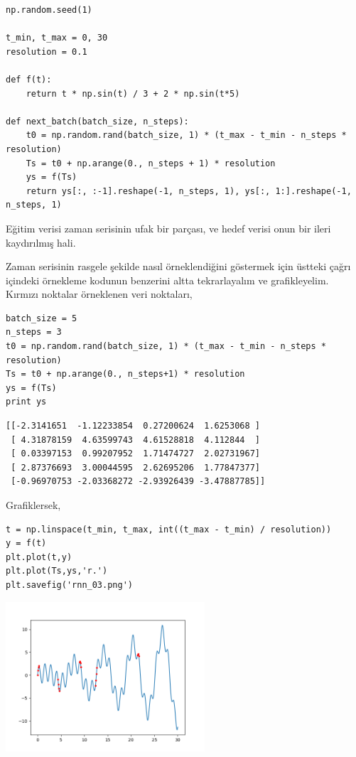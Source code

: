 \documentclass[12pt,fleqn]{article}\usepackage{../../common}
\begin{document}
\begin{verbatim}
np.random.seed(1)

t_min, t_max = 0, 30
resolution = 0.1

def f(t):
    return t * np.sin(t) / 3 + 2 * np.sin(t*5)

def next_batch(batch_size, n_steps):
    t0 = np.random.rand(batch_size, 1) * (t_max - t_min - n_steps * resolution)
    Ts = t0 + np.arange(0., n_steps + 1) * resolution
    ys = f(Ts)
    return ys[:, :-1].reshape(-1, n_steps, 1), ys[:, 1:].reshape(-1, n_steps, 1)
\end{verbatim}

Eğitim verisi zaman serisinin ufak bir parçası, ve hedef verisi onun bir
ileri kaydırılmış hali. 

Zaman serisinin rasgele şekilde nasıl örneklendiğini göstermek için üstteki
çağrı içindeki örnekleme kodunun benzerini altta tekrarlayalım ve
grafikleyelim. Kırmızı noktalar örneklenen veri noktaları,

\begin{verbatim}
batch_size = 5
n_steps = 3
t0 = np.random.rand(batch_size, 1) * (t_max - t_min - n_steps * resolution)
Ts = t0 + np.arange(0., n_steps+1) * resolution
ys = f(Ts)
print ys
\end{verbatim}

\begin{verbatim}
[[-2.3141651  -1.12233854  0.27200624  1.6253068 ]
 [ 4.31878159  4.63599743  4.61528818  4.112844  ]
 [ 0.03397153  0.99207952  1.71474727  2.02731967]
 [ 2.87376693  3.00044595  2.62695206  1.77847377]
 [-0.96970753 -2.03368272 -2.93926439 -3.47887785]]
\end{verbatim}

Grafiklersek,

\begin{verbatim}
t = np.linspace(t_min, t_max, int((t_max - t_min) / resolution))
y = f(t)
plt.plot(t,y)
plt.plot(Ts,ys,'r.')
plt.savefig('rnn_03.png')
\end{verbatim}

\includegraphics[width=20em]{rnn_03.png}
\end{document}
